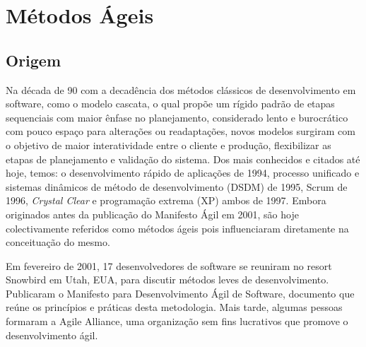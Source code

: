 \chapter{Métodos Ágeis}
\label{cap:metodosageis}
\section{Origem}
\par  Na década de 90 com a decadência dos métodos clássicos de desenvolvimento em software, como o modelo cascata, o qual propõe um rígido padrão de etapas sequenciais com maior ênfase no planejamento, considerado lento e burocrático com pouco espaço para alterações ou readaptações, novos modelos surgiram com o objetivo de maior interatividade entre o cliente e produção, flexibilizar as etapas de planejamento e validação do sistema. Dos mais conhecidos e citados até hoje, temos: o desenvolvimento rápido de aplicações de 1994, processo unificado e sistemas dinâmicos de método de desenvolvimento (DSDM) de 1995, Scrum de 1996, \emph{Crystal Clear} e programação extrema (XP) ambos de 1997. Embora originados antes da publicação do Manifesto Ágil em 2001, são hoje colectivamente referidos como métodos ágeis pois influenciaram diretamente na conceituação do mesmo.
\par Em fevereiro de 2001, 17 desenvolvedores de software se reuniram no resort Snowbird em Utah, EUA, para discutir métodos leves de desenvolvimento. Publicaram o Manifesto para Desenvolvimento Ágil de Software, documento que reúne os princípios e práticas desta metodologia. Mais tarde, algumas pessoas formaram a Agile Alliance, uma organização sem fins lucrativos que promove o desenvolvimento ágil.

